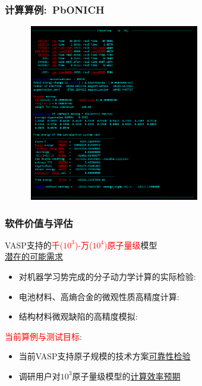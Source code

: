 \begin{frame}
	\frametitle{计算算例:~\textrm{PbONICH}}
\begin{figure}[h!]
\centering
\vskip -0.21in
\includegraphics[height=3.05in,width=3.00in,viewport=0 0 1000 1152,clip]{Figures/VASP_huge_Ningde-PbONICH_OUTCAR.png}
\label{VASP_Model-3}
\end{figure} 
\end{frame}

\frame
{
	\frametitle{软件价值与评估}
\textrm{VASP}支持的\textcolor{red}{千($10^3$)-万($10^4$)原子量级}模型\\
\underline{潜在的可能需求}
\begin{itemize}
		\setlength{\itemsep}{10pt}
		\item 	对机器学习势完成的分子动力学计算的实际检验:\\
			{\fontsize{7.2pt}{5.2pt}\selectfont{是否可以彻底摆脱对第一原理大规模计算的约束}}
		\item 电池材料、高熵合金的微观性质高精度计算:\\
			{\fontsize{7.2pt}{5.2pt}\selectfont{高精度的应用级模拟}}
		\item 结构材料微观缺陷的高精度模拟:\\
			{\fontsize{7.2pt}{5.2pt}\selectfont{高精度的材料可观测实验组数据对照}}
	\end{itemize}
	\vskip 5pt
	\textcolor{red}{当前算例与测试目标}:~
	\begin{itemize}
		\item 当前\textrm{VASP}支持原子规模的技术方案\underline{可靠性检验}
		\item 调研用户对$10^3$原子量级模型的\underline{计算效率预期}
	\end{itemize}
}

